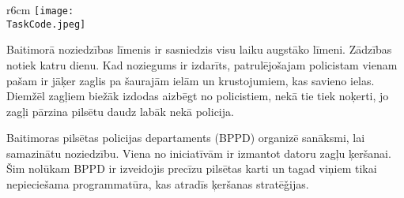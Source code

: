 \documentclass{boi2014-lv}
\renewcommand{\TaskCode}{coprobber}
\begin{document}
    \begin{wrapfigure}[8]{r}{6cm}
        \vspace{-24pt}
		\texttt{[image: \\TaskCode.jpeg]}
	\end{wrapfigure}

	Baitimorā noziedzības līmenis ir sasniedzis visu laiku augstāko līmeni. Zādzības notiek katru dienu. Kad noziegums ir izdarīts, patrulējošajam policistam vienam pašam ir jāķer zaglis pa šaurajām ielām un krustojumiem, kas savieno ielas. Diemžēl zagļiem biežāk izdodas aizbēgt no policistiem, nekā tie tiek noķerti, jo zagļi pārzina pilsētu daudz labāk nekā policija.

	Baitimoras pilsētas policijas departaments (BPPD) organizē sanāksmi, lai samazinātu noziedzību. Viena no iniciatīvām ir izmantot datoru zagļu ķeršanai. Šim nolūkam BPPD ir izveidojis precīzu pilsētas karti un tagad viņiem tikai nepieciešama programmatūra, kas atradīs ķeršanas stratē\v{g}ijas.

\end{document}
